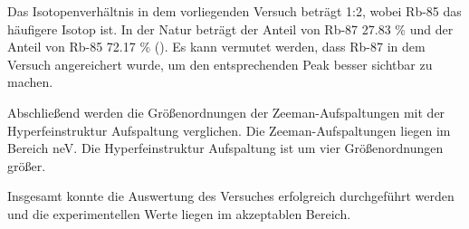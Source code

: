 Das Isotopenverhältnis in dem vorliegenden Versuch beträgt 1:2, wobei Rb-85 das häufigere Isotop ist.
In der Natur beträgt der Anteil von Rb-87 27.83 \% und der Anteil von Rb-85 72.17 \% (\cite{rubidium}).
Es kann vermutet werden, dass Rb-87 in dem Versuch angereichert wurde, um den entsprechenden Peak besser sichtbar zu machen.

Abschließend werden die Größenordnungen der Zeeman-Aufspaltungen mit der Hyperfeinstruktur Aufspaltung verglichen.
Die Zeeman-Aufspaltungen liegen im Bereich \unit{\nano\eV}.
Die Hyperfeinstruktur Aufspaltung ist um vier Größenordnungen größer.

Insgesamt konnte die Auswertung des Versuches erfolgreich durchgeführt werden und die experimentellen Werte liegen im akzeptablen Bereich.

